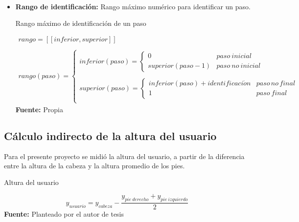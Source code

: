 \begin{itemize}
\item \textbf{Rango de identificaci\'on:} Rango m\'aximo num\'erico para identificar un paso.
\begin{formula}[H]
	\centering
	\caption{Rango m\'aximo de identificaci\'on de un paso}
	\label{frm:idenStep}
	\begin{equation}
\begin{matrix}
rango = [[inferior,superior]] \\
\\
rango(paso)=\left\{\begin{matrix}
inferior(paso)= \left\{\begin{matrix}
0 & paso\: inicial\\ 
superior(paso-1) & paso\: no\: inicial
\end{matrix}\right.\\ 
\\
superior(paso)= \left\{\begin{matrix}
inferior(paso)+identificaci\acute{o}n & paso\, no\, final\\ 
1 & paso\: final

\end{matrix}\right.\\ 
\end{matrix}\right.
\end{matrix}
	\end{equation}
	\textbf{Fuente:} Propia
\end{formula} 
\end{itemize}
\subsection{C\'alculo indirecto de la altura del usuario} \label{dis:height}
Para el presente proyecto se midi\'o la altura del usuario, a partir de la diferencia entre la altura de la cabeza y la altura promedio de los pies.
	\begin{formula}[H]
	\centering
	\caption{Altura del usuario}
	\label{frm:alturaUser}
	\begin{equation}
y_{usuario}=y_{cabeza}-\frac{y_{pie \: derecho}+y_{pie \: izquierdo}}{2}
	\end{equation}
			\textbf{Fuente:} Planteado por el autor de tesis
\end{formula} 
